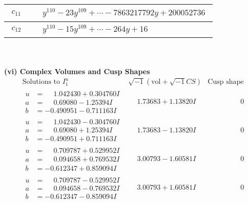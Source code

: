 \documentclass[1p]{elsarticle_modified}
\theoremstyle{definition}
\newcommand{\I}{\sqrt{-1}}
\begin{document}
\begin{tabular}{m{50pt}|m{274pt}}
\hline $$\begin{aligned}c_{11}\end{aligned}$$&$\begin{aligned}
&y^{110}-23 y^{109}+\cdots-7863217792 y+200052736
\end{aligned}$\\
\hline $$\begin{aligned}c_{12}\end{aligned}$$&$\begin{aligned}
&y^{110}-15 y^{109}+\cdots-264 y+16
\end{aligned}$\\
\hline
\end{tabular}\\~\\
\newpage\flushleft \textbf{(vi) Complex Volumes and Cusp Shapes}
$$\begin{array}{c|c|c}  
\text{Solutions to }I^u_{1}& \I (\text{vol} + \sqrt{-1}CS) & \text{Cusp shape}\\
 \hline 
\begin{aligned}
u &= \phantom{-}1.042430 + 0.304760 I \\
a &= \phantom{-}0.69080 - 1.25394 I \\
b &= -0.490951 - 0.711163 I\end{aligned}
 & \phantom{-}1.73683 + 1.13820 I & \phantom{-0.000000 } 0 \\ \hline\begin{aligned}
u &= \phantom{-}1.042430 - 0.304760 I \\
a &= \phantom{-}0.69080 + 1.25394 I \\
b &= -0.490951 + 0.711163 I\end{aligned}
 & \phantom{-}1.73683 - 1.13820 I & \phantom{-0.000000 } 0 \\ \hline\begin{aligned}
u &= \phantom{-}0.709787 + 0.529952 I \\
a &= \phantom{-}0.094658 + 0.769532 I \\
b &= -0.612347 + 0.859094 I\end{aligned}
 & \phantom{-}3.00793 - 1.60581 I & \phantom{-0.000000 } 0 \\ \hline\begin{aligned}
u &= \phantom{-}0.709787 - 0.529952 I \\
a &= \phantom{-}0.094658 - 0.769532 I \\
b &= -0.612347 - 0.859094 I\end{aligned}
 & \phantom{-}3.00793 + 1.60581 I & \phantom{-0.000000 } 0 \\ \hline\begin{aligned}

\end{aligned}
\end{array}$$
\end{document}
